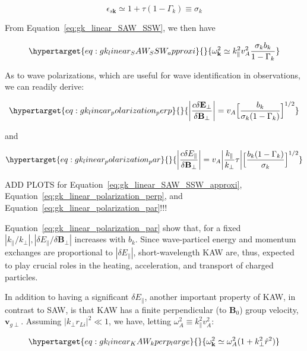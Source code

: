 \documentclass[
  notoc %
]{tufte-book}
\begin{document}
\[
\epsilon_{s\mathbf{k}} \simeq 1+\tau(1-\Gamma_k) \equiv \sigma_k
\]

From Equation~\ref{eq:gk_linear_SAW_SSW}, we then have

\begin{equation}\protect\hypertarget{eq:gk_linear_SAW_SSW_approxi}{}{
\omega_{\mathbf{k}}^2 \simeq k_\parallel^2 v_A^2\frac{\sigma_k b_k}{1-\Gamma_k}
}\label{eq:gk_linear_SAW_SSW_approxi}\end{equation}

As to wave polarizations, which are useful for wave identification in
observations, we can readily derive:

\begin{equation}\protect\hypertarget{eq:gk_linear_polarization_perp}{}{
\bigg\lvert \frac{c\delta\mathbf{E}_\perp}{\delta\mathbf{B}_\perp} \bigg\rvert = v_A \Big[ \frac{b_k}{\sigma_k(1-\Gamma_k)}\Big]^{1/2}
}\label{eq:gk_linear_polarization_perp}\end{equation}

and

\begin{equation}\protect\hypertarget{eq:gk_linear_polarization_par}{}{
\bigg\lvert \frac{c\delta E_\parallel}{\delta\mathbf{B}_\perp} \bigg\rvert = v_A \bigg\lvert \frac{k_\parallel}{k_\perp}\tau \bigg\rvert\Big[ \frac{b_k(1-\Gamma_k)}{\sigma_k} \Big]^{1/2}
}\label{eq:gk_linear_polarization_par}\end{equation}

ADD PLOTS for Equation~\ref{eq:gk_linear_SAW_SSW_approxi},
Equation~\ref{eq:gk_linear_polarization_perp}, and
Equation~\ref{eq:gk_linear_polarization_par}!!!

Equation~\ref{eq:gk_linear_polarization_par} show that, for a fixed
\(|k_\parallel/k_\perp|, |\delta E_\parallel/\delta\mathbf{B}_\perp|\)
increases with \(b_k\). Since wave-particel energy and momentum
exchanges are proportional to \(|\delta E_\parallel|\), short-wavelength
KAW are, thus, expected to play crucial roles in the heating,
acceleration, and transport of charged particles.

In addition to having a significant \(\delta E_\parallel\), another
important property of KAW, in contrast to SAW, is that KAW has a finite
perpendicular (to \(\mathbf{B}_0\)) group velocity,
\(\mathbf{v}_{g\perp}\). Assuming \(|k_\perp r_{Li}|^2\ll 1\), we have,
letting \(\omega_A^2\equiv k_\parallel^2 v_A^2\):

\begin{equation}\protect\hypertarget{eq:gk_linear_KAW_kperp_large}{}{
\omega_\mathbf{k}^2 \simeq \omega_A^2(1+k_\perp^2 \hat{r}^2)
}\label{eq:gk_linear_KAW_kperp_large}\end{equation}
\end{document}
